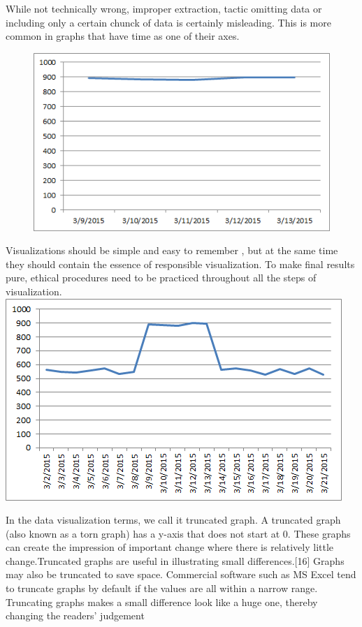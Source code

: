 \documentclass[]{book}
\theoremstyle{definition}
\theoremstyle{definition}
\theoremstyle{definition}
\theoremstyle{remark}
\begin{document}
While not technically wrong, improper extraction, tactic omitting data
or including only a certain chunck of data is certainly misleading. This
is more common in graphs that have time as one of their axes.

\begin{figure}
\centering
\includegraphics{images/Bad_graph_extraction.png}
\caption{}
\end{figure}

Visualizations should be simple and easy to remember , but at the same
time they should contain the essence of responsible visualization. To
make final results pure, ethical procedures need to be practiced
throughout all the steps of visualization.
\includegraphics{images/Good_graph_extraction.png}

In the data visualization terms, we call it truncated graph. A truncated
graph (also known as a torn graph) has a y-axis that does not start at
0. These graphs can create the impression of important change where
there is relatively little change.Truncated graphs are useful in
illustrating small differences.{[}16{]} Graphs may also be truncated to
save space. Commercial software such as MS Excel tend to truncate graphs
by default if the values are all within a narrow range. Truncating
graphs makes a small difference look like a huge one, thereby changing
the readers' judgement
\end{document}

